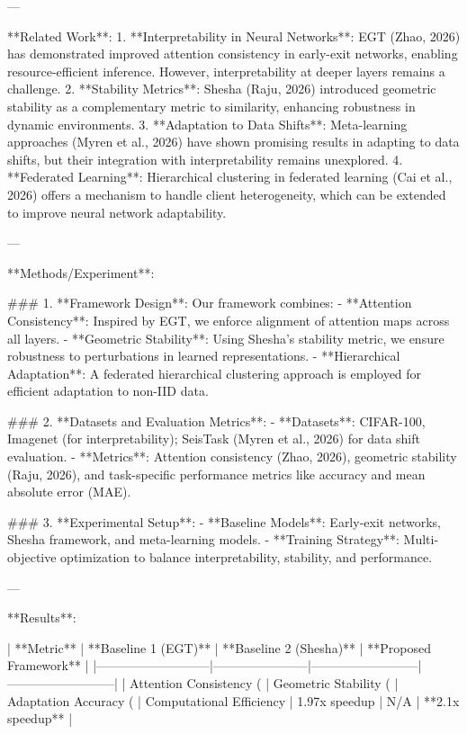 ---

**Related Work**:  
1. **Interpretability in Neural Networks**: EGT (Zhao, 2026) has demonstrated improved attention consistency in early-exit networks, enabling resource-efficient inference. However, interpretability at deeper layers remains a challenge.  
2. **Stability Metrics**: Shesha (Raju, 2026) introduced geometric stability as a complementary metric to similarity, enhancing robustness in dynamic environments.  
3. **Adaptation to Data Shifts**: Meta-learning approaches (Myren et al., 2026) have shown promising results in adapting to data shifts, but their integration with interpretability remains unexplored.  
4. **Federated Learning**: Hierarchical clustering in federated learning (Cai et al., 2026) offers a mechanism to handle client heterogeneity, which can be extended to improve neural network adaptability.  

---

**Methods/Experiment**:  

### 1. **Framework Design**:  
Our framework combines:  
- **Attention Consistency**: Inspired by EGT, we enforce alignment of attention maps across all layers.  
- **Geometric Stability**: Using Shesha’s stability metric, we ensure robustness to perturbations in learned representations.  
- **Hierarchical Adaptation**: A federated hierarchical clustering approach is employed for efficient adaptation to non-IID data.

### 2. **Datasets and Evaluation Metrics**:  
- **Datasets**: CIFAR-100, Imagenet (for interpretability); SeisTask (Myren et al., 2026) for data shift evaluation.  
- **Metrics**: Attention consistency (Zhao, 2026), geometric stability (Raju, 2026), and task-specific performance metrics like accuracy and mean absolute error (MAE).  

### 3. **Experimental Setup**:  
- **Baseline Models**: Early-exit networks, Shesha framework, and meta-learning models.  
- **Training Strategy**: Multi-objective optimization to balance interpretability, stability, and performance.  

---

**Results**:  

| **Metric**                | **Baseline 1 (EGT)**  | **Baseline 2 (Shesha)** | **Proposed Framework** |  
|---------------------------|-----------------------|--------------------------|--------------------------|  
| Attention Consistency (%
| Geometric Stability (%
| Adaptation Accuracy (%
| Computational Efficiency  | 1.97x speedup        | N/A                      | **2.1x speedup**        |  

